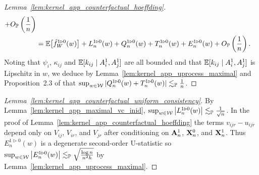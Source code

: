 \begin{proof}[Lemma~\ref{lem:kernel_app_counterfactual_hoeffding}]
\begin{align*}
    + O_{\mathbb{P}}\left( \frac{1}{n} \right) \\
    &=
    \mathbb{E}\big[\hat f_W^{1 \triangleright 0}(w) \big]
    + L_n^{1 \triangleright 0}(w)
    + Q_n^{1 \triangleright 0}(w)
    + T_n^{1 \triangleright 0}(w)
    + E_n^{1 \triangleright 0}(w)
    + O_{\mathbb{P}}\left( \frac{1}{n} \right).
  \end{align*}
  Noting that $\psi_i$, $\kappa_{i j}$
  and $\mathbb{E}[k_{i j} \mid A_i^1, A_j^1]$
  are all bounded and that
  $\mathbb{E}[k_{i j} \mid A_i^1, A_j^1]$
  is Lipschitz in $w$,
  we deduce by
  Lemma~\ref{lem:kernel_app_uprocess_maximal}
  and Proposition~2.3 of
  \citet{arcones1993limit} that
  $\sup_{w \in \mathcal{W}} |Q_n^{1 \triangleright 0}(w)
  + T_n^{1 \triangleright 0}(w)| \lesssim_{\mathbb{P}} \frac 1n$.
\end{proof}

\begin{proof}[Lemma~\ref{lem:kernel_app_counterfactual_uniform_consistency}]

  By Lemma~\ref{lem:kernel_app_maximal_vc_inid},
  $\sup_{w \in \mathcal{W}} \big|L_n^{1 \triangleright 0}(w)\big|
  \lesssim_{\mathbb{P}} \frac{1}{\sqrt n}$.
  In the proof of Lemma~\ref{lem:kernel_app_counterfactual_hoeffding}
  the terms $v_{i j r} - u_{i j r}$ depend only on
  $V_{i j}$, $V_{i r}$, and $V_{jr}$
  after conditioning on $\mathbf{A}_n^1$, $\mathbf{X}_n^0$, and $\mathbf{X}_n^1$.
  Thus $E_n^{1 \triangleright 0}(w)$ is a degenerate second-order
  U-statistic so
  $\sup_{w \in \mathcal{W}} \big|E_n^{1 \triangleright 0}(w)\big|
  \lesssim_{\mathbb{P}} \sqrt{\frac{\log n}{n^2h}}$
  by Lemma~\ref{lem:kernel_app_uprocess_maximal}.
\end{proof}

